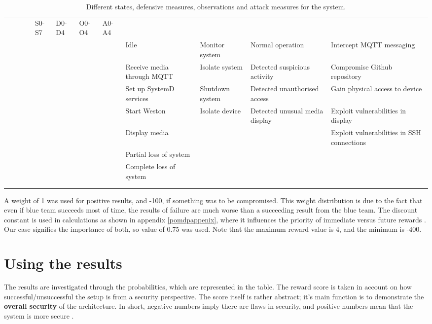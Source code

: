 \begin{landscape}
\begin{table}
\centering
\begin{tabular}{ |c|c|c|c| }
 \hline & & & & S0-S7 & D0-D4 & O0-O4 & A0-A4 \\ & & & & \hline \hline
 & & & & Idle & Monitor system & Normal operation & Intercept MQTT
 messaging \\ & & & & \hline & & & & Receive media through MQTT &
 Isolate system & Detected suspicious activity & Compromise Github
 repository \\ & & & & \hline & & & & Set up SystemD services &
 Shutdown system & Detected unauthorised access & Gain physical access
 to device \\ & & & & \hline & & & & Start Weston & Isolate device &
 Detected unusual media display & Exploit vulnerabilities in display
 \\ & & & & \hline & & & & Display media & & & Exploit vulnerabilities
 in SSH connections \\ & & & & \hline & & & & Partial loss of system &
 \ & \ & \\ & & & & \hline & & & & Complete loss of system & & & \\ &
 & & & \hline & & & & & & & \\ & & & & \hline

\end{tabular}
\caption{Different states, defensive measures, observations and attack
  measures for the system.}
\label{pomdbtable}
\end{table}
\end{landscape}

A weight of 1 was used for positive results, and -100, if something
was to be compromised. This weight distribution is due to the fact
that even if blue team succeeds most of time, the results of failure
are much worse than a succeeding result from the blue team. The
discount constant is used in calculations as shown in appendix 
\ref{pomdpappenix}, where it influences the priority of immediate
versus future rewards \cite{mcabeeMarkov}. Our case signifies the
importance of both, so value of 0.75 was used. Note that the maximum
reward value is 4, and the minimum is -400.

\section{Using the results} \label{usingtheresults}

The results are investigated through the probabilities, which are
represented in the table. The reward score is taken in account on how
successful/unsuccessful the setup is from a security perspective. The
score itself is rather abstract; it's main function is to demonstrate
the \textbf{overall security} of the architecture. In short, negative
numbers imply there are flaws in security, and positive numbers mean
that the system is more secure
\cite{mcabeeMarkov}.

